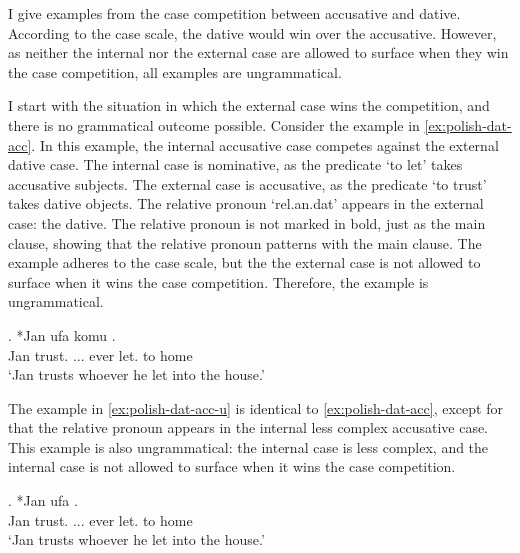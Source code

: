 I give examples from the case competition between accusative and dative. According to the case scale, the dative would win over the accusative. However, as neither the internal nor the external case are allowed to surface when they win the case competition, all examples are ungrammatical.

I start with the situation in which the external case wins the competition, and there is no grammatical outcome possible.
Consider the example in \ref{ex:polish-dat-acc}. In this example, the internal accusative case competes against the external dative case.
The internal case is nominative, as the predicate  `to let' takes accusative subjects.
The external case is accusative, as the predicate  `to trust' takes dative objects.
The relative pronoun  `\ac{rel}.\ac{an}.\ac{dat}' appears in the external case: the dative. The relative pronoun is not marked in bold, just as the main clause, showing that the relative pronoun patterns with the main clause.
The example adheres to the case scale, but the the external case is not allowed to surface when it wins the case competition. Therefore, the example is ungrammatical.

\exg. *Jan ufa komu    .\\
Jan trust. ... ever let. to home\\
`Jan trusts whoever he let into the house.' \label{ex:polish-dat-acc}

The example in \ref{ex:polish-dat-acc-u} is identical to \ref{ex:polish-dat-acc}, except for that the relative pronoun appears in the internal less complex accusative case. This example is also ungrammatical: the internal case is less complex, and the internal case is not allowed to surface when it wins the case competition.

\exg. *Jan ufa     .\\
Jan trust. ... ever let. to home\\
`Jan trusts whoever he let into the house.' \label{ex:polish-dat-acc-u}

